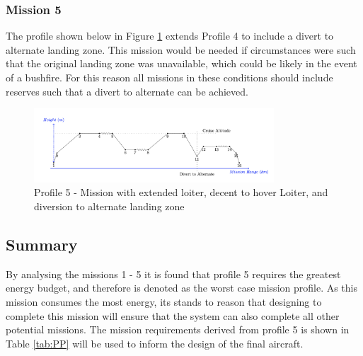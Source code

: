 \subsubsection{Mission 5}
The profile shown below in Figure \ref{fig:miss5} extends Profile 4 to include a divert to alternate landing zone. This mission would be needed if circumstances were such that the original landing zone was unavailable, which could be likely in the event of a bushfire. For this reason all missions in these conditions should include reserves such that a divert to alternate can be achieved.

\begin{figure}[H]
    \centering
    \includegraphics[width=0.8\textwidth]{PrelimSizing/mission3.png}
    \caption{Profile 5 - Mission with extended loiter, decent to hover Loiter, and diversion to alternate landing zone}
    \label{fig:miss5}
\end{figure}

\subsection{Summary}
By analysing the missions 1 - 5 it is found that profile 5 requires the greatest energy budget, and therefore is denoted as the worst case mission profile. As this mission consumes the most energy, its stands to reason that designing to complete this mission will ensure that the system can also complete all other potential missions. The mission requirements derived from profile 5 is shown in Table \ref{tab:PP} will be used to inform the design of the final aircraft. 


